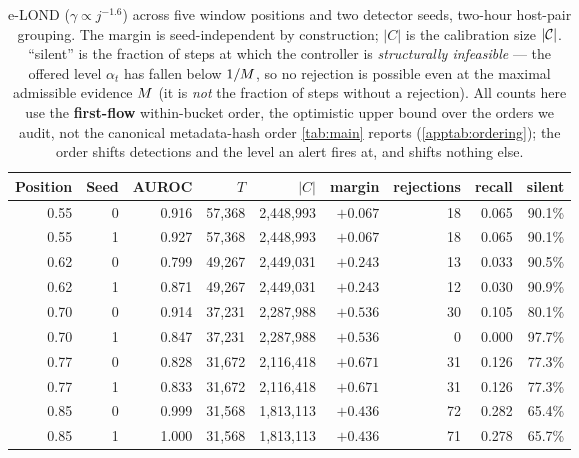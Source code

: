 \begin{table}[t]
\centering
\caption{e-LOND ($\gamma\propto j^{-1.6}$) across five window positions and two detector
seeds, two-hour host-pair grouping. The margin is seed-independent by construction;
$\lvert C\rvert$ is the calibration size $\lvert\mathcal{C}\rvert$. ``silent'' is the fraction of steps at which the
controller is \emph{structurally infeasible} --- the offered level $\alpha_t$ has fallen below
$1/M$, so no rejection is possible even at the maximal admissible evidence $M$ (it is
\emph{not} the fraction of steps without a rejection). All counts here use the \textbf{first-flow} within-bucket order, the optimistic upper bound over the orders we audit, not the canonical metadata-hash order \cref{tab:main} reports (\cref{apptab:ordering}); the order shifts detections and the level an alert fires at, and shifts nothing else.}
\label{apptab:detection}
\begin{tabular}{rrrrrrrrr}
\toprule
Position & Seed & AUROC & $T$ & $\lvert C\rvert$ & margin & rejections & recall & silent \\
\midrule
0.55 & 0 & 0.916 & 57,368 & 2,448,993 & $+0.067$ & 18 & 0.065 & 90.1\% \\
0.55 & 1 & 0.927 & 57,368 & 2,448,993 & $+0.067$ & 18 & 0.065 & 90.1\% \\
0.62 & 0 & 0.799 & 49,267 & 2,449,031 & $+0.243$ & 13 & 0.033 & 90.5\% \\
0.62 & 1 & 0.871 & 49,267 & 2,449,031 & $+0.243$ & 12 & 0.030 & 90.9\% \\
0.70 & 0 & 0.914 & 37,231 & 2,287,988 & $+0.536$ & 30 & 0.105 & 80.1\% \\
0.70 & 1 & 0.847 & 37,231 & 2,287,988 & $+0.536$ & 0 & 0.000 & 97.7\% \\
0.77 & 0 & 0.828 & 31,672 & 2,116,418 & $+0.671$ & 31 & 0.126 & 77.3\% \\
0.77 & 1 & 0.833 & 31,672 & 2,116,418 & $+0.671$ & 31 & 0.126 & 77.3\% \\
0.85 & 0 & 0.999 & 31,568 & 1,813,113 & $+0.436$ & 72 & 0.282 & 65.4\% \\
0.85 & 1 & 1.000 & 31,568 & 1,813,113 & $+0.436$ & 71 & 0.278 & 65.7\% \\
\bottomrule
\end{tabular}
\end{table}
